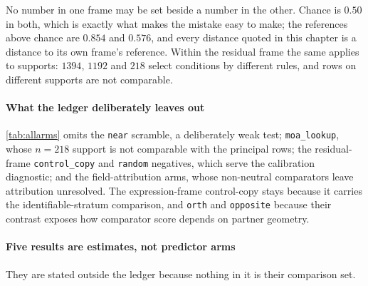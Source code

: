 \begin{scopelimit}
No number in one frame may be set beside a number in the other. Chance is $0.50$
in both, which is exactly what makes the mistake easy to make; the references
above chance are $0.854$ and $0.576$, and every distance quoted in this chapter is
a distance to its own frame's reference. Within the residual frame the same
applies to supports: $\num{1394}$, $\num{1192}$ and $\num{218}$ select conditions
by different rules, and rows on different supports are not comparable.
\end{scopelimit}

\paragraph{What the ledger deliberately leaves out} \cref{tab:allarms} omits the
\texttt{near} scramble, a deliberately weak test; \texttt{moa\_lookup}, whose
$n=218$ support is not comparable with the principal rows; the residual-frame
\texttt{control\_copy} and \texttt{random} negatives, which serve the calibration
diagnostic; and the field-attribution arms, whose non-neutral comparators leave
attribution unresolved. The expression-frame control-copy stays because it
carries the identifiable-stratum comparison, and \texttt{orth} and
\texttt{opposite} because their contrast exposes how comparator score depends on
partner geometry.

\paragraph{Five results are estimates, not predictor arms} They are stated
outside the ledger because nothing in it is their comparison set.

